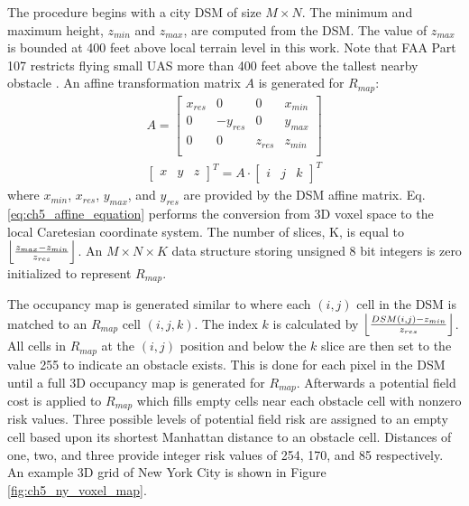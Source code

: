 The procedure begins with a city \ac{DSM} of size $M\times N$. The minimum and maximum height, $z_{min}$ and $z_{max}$, are computed from the \ac{DSM}. The value of $z_{max}$ is bounded at 400 feet above local terrain level in this work. Note that FAA Part 107 restricts flying small \ac{UAS} more than 400 feet above the tallest nearby obstacle \cite{federal_aviation_administration_code_2016}. An affine transformation matrix $A$ is generated for $R_{map}$:
\begin{align}
        A = \begin{bmatrix} \label{eq:ch5_affine_matrix}
        x_{res} & 0 & 0 & x_{min} \\
        0 &  -y_{res} & 0 & {y_{max}} \\
        0 &  0 & z_{res} & {z_{min}} \\
        \end{bmatrix}  \\
        \begin{bmatrix}x & y & z  \end{bmatrix}^T = A \cdot \begin{bmatrix}i & j & k  \end{bmatrix}^T \label{eq:ch5_affine_equation}
\end{align}
where $x_{min}$, $x_{res}$, $y_{max}$, and $y_{res}$ are provided by the \ac{DSM} affine matrix. Eq. \ref{eq:ch5_affine_equation} performs the conversion from 3D voxel space to the local Caretesian coordinate system.  
The number of slices, K, is equal to $\floor*{\frac{z_{max} - z_{min}}{z_{res}}}$. An $M \times N \times K$ data structure storing unsigned 8 bit integers is zero initialized to represent $R_{map}$.

The occupancy map is generated similar to \cite{ten_harmsel_emergency_2017} where each $(i,j)$ cell in the \ac{DSM} is matched to an $R_{map}$ cell $(i, j, k)$. The index $k$ is calculated by $\floor*{\frac{DSM(i,j) - z_{min}}{z_{res}}}$. All cells in $R_{map}$ at the $(i,j)$ position and below the $k$ slice are then set to the value 255 to indicate an obstacle exists. This is done for each pixel in the \ac{DSM} until a full 3D occupancy map is generated for $R_{map}$.  Afterwards a potential field cost is applied to $R_{map}$ which fills empty cells near each obstacle cell with nonzero risk values.  Three possible levels of potential field risk are assigned to an empty cell based upon its shortest Manhattan distance to an obstacle cell. Distances of one, two, and three provide integer risk values of 254, 170, and 85 respectively. An example 3D grid of New York City is shown in Figure \ref{fig:ch5_ny_voxel_map}.

